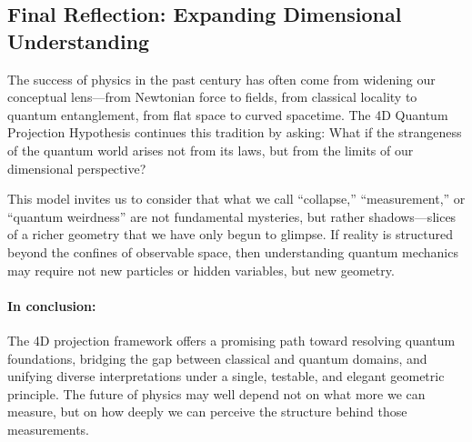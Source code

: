 \documentclass[12pt]{article}
\begin{document}
\subsection*{Final Reflection: Expanding Dimensional Understanding}

The success of physics in the past century has often come from widening our conceptual lens—from Newtonian force to fields, from classical locality to quantum entanglement, from flat space to curved spacetime. The 4D Quantum Projection Hypothesis continues this tradition by asking: What if the strangeness of the quantum world arises not from its laws, but from the limits of our dimensional perspective?

This model invites us to consider that what we call “collapse,” “measurement,” or “quantum weirdness” are not fundamental mysteries, but rather shadows—slices of a richer geometry that we have only begun to glimpse. If reality is structured beyond the confines of observable space, then understanding quantum mechanics may require not new particles or hidden variables, but new geometry.

\paragraph{In conclusion:} The 4D projection framework offers a promising path toward resolving quantum foundations, bridging the gap between classical and quantum domains, and unifying diverse interpretations under a single, testable, and elegant geometric principle. The future of physics may well depend not on what more we can measure, but on how deeply we can perceive the structure behind those measurements.
\end{document}
